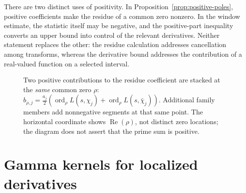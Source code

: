 \documentclass[11pt,openany,oneside]{scrbook}
\theoremstyle{definition}
\theoremstyle{remark}
\newcommand{\Rea}{\operatorname{Re}}
\newcommand{\ord}{\operatorname{ord}}
\begin{document}
There are two distinct uses of positivity. In Proposition~\ref{prop:positive-poles}, positive coefficients make the residue of a common zero nonzero. In the window estimate, the statistic itself may be negative, and the positive-part inequality converts an upper bound into control of the relevant derivatives. Neither statement replaces the other: the residue calculation addresses cancellation among transforms, whereas the derivative bound addresses the contribution of a real-valued function on a selected interval.

\begin{figure}[ht]
\centering
{}
\caption{Two positive contributions to the residue coefficient are stacked at the \emph{same} common zero $\rho$: $b_{\rho,j}=\tfrac{a_j}{2}(\ord_\rho L(s,\chi_j)+\ord_\rho L(s,\bar\chi_j))$. Additional family members add nonnegative segments at that same point. The horizontal coordinate shows $\Rea(\rho)$, not distinct zero locations; the diagram does not assert that the prime sum is positive.}
\label{fig:positive-poles}
\end{figure}

\section{Gamma kernels for localized derivatives}\label{sec:gamma-kernels}
\end{document}
